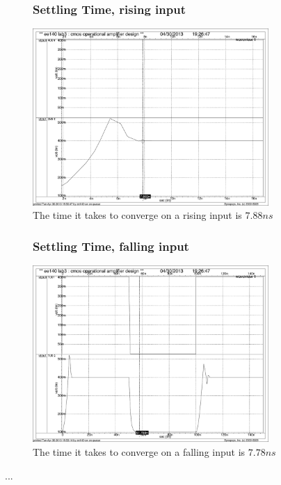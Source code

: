 \documentclass[]{article}
\begin{document}
		\begin{figure}
				\subsubsection{Settling Time, rising input}
				\includegraphics[width=0.8\textwidth]{settling_time_t1.pdf}
				\caption{The time it takes to converge on a rising input is $7.88ns$}
		\end{figure}
		
		\begin{figure}
				\subsubsection{Settling Time, falling input}
				\includegraphics[width=0.8\textwidth]{settling_time_t2.pdf}
				\caption{The time it takes to converge on a falling input is $7.78ns$}
		\end{figure}
		\pagebreak
		...
		\newpage
\end{document}
